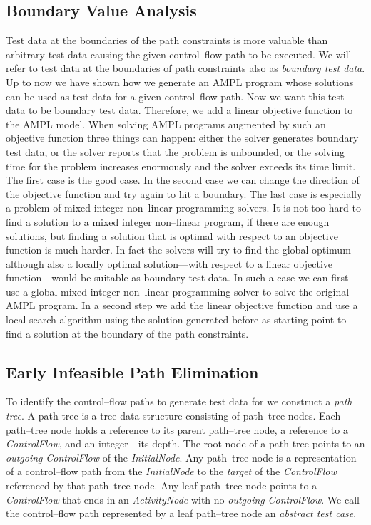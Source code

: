 \documentclass[runningheads,a4paper]{llncs}%
\newcommand{\UMLType}[1]{\textsf{\textit{#1}}} %
\newcommand{\UMLReference}[1]{\textsf{\textit{#1}}} %
\begin{document}
\subsection{Boundary Value Analysis}%
\label{sec:BoundaryValueAnalysis}%
Test data at the boundaries of the path constraints is more valuable than
arbitrary test data causing the given control--flow path to be executed. We will
refer to test data at the boundaries of path constraints also as \emph{boundary
test data}. Up to now we have shown how we generate an AMPL program whose
solutions can be used as test data for a given control--flow path. Now we want
this test data to be boundary test data. Therefore, we add a linear objective
function to the AMPL model. When solving AMPL programs augmented by such an
objective function three things can happen: either the solver generates boundary
test data, or the solver reports that the problem is unbounded, or the solving
time for the problem increases enormously and the solver exceeds its time limit.
The first case is the good case. In the second case we can change the direction
of the objective function and try again to hit a boundary. The last case is
especially a problem of mixed integer non--linear programming solvers. It is not
too hard to find a solution to a mixed integer non--linear program, if there are
enough solutions, but finding a solution that is optimal with respect to an
objective function is much harder. In fact the solvers will try to find the
global optimum although also a locally optimal solution---with respect to a
linear objective function---would be suitable as boundary test data. In such a
case we can first use a global mixed integer non--linear programming solver to
solve the original AMPL program. In a second step we add the linear objective
function and use a local search algorithm using the solution generated before as
starting point to find a solution at the boundary of the path constraints.
\subsection{Early Infeasible Path Elimination}%
\label{sec:InfeasiblePathElimination}%
To identify the control--flow paths to generate test data for we construct a
\emph{path tree}. A path tree is a tree data structure consisting of path--tree
nodes. Each path--tree node holds a reference to its parent path--tree node, a
reference to a \UMLType{ControlFlow}, and an integer---its depth. The root node
of a path tree points to an \UMLReference{outgoing} \UMLType{ControlFlow} of the
\UMLType{InitialNode}. Any path--tree node is a representation of a
control--flow path from the \UMLType{InitialNode} to the \UMLReference{target}
of the \UMLType{ControlFlow} referenced by that path--tree node. Any leaf
path--tree node points to a \UMLType{ControlFlow} that ends in an
\UMLType{ActivityNode} with no \UMLReference{outgoing} \UMLType{ControlFlow}. We
call the control--flow path represented by a leaf path--tree node an
\emph{abstract test case}.
\end{document}
